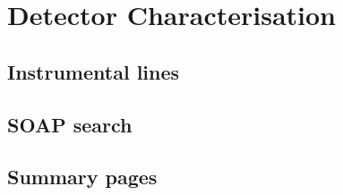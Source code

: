 \chapter{Detector Characterisation}

\section{Instrumental lines}

\section{SOAP search}

\section{Summary pages}



